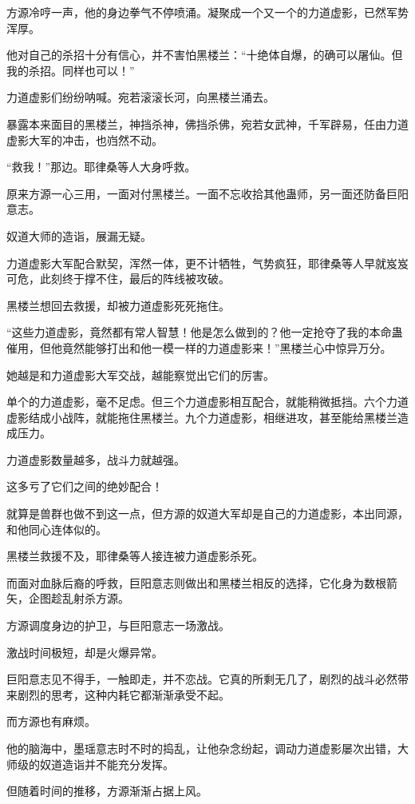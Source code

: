 \begin{this_body}
方源冷哼一声，他的身边拳气不停喷涌。凝聚成一个又一个的力道虚影，已然军势浑厚。

他对自己的杀招十分有信心，并不害怕黑楼兰：“十绝体自爆，的确可以屠仙。但我的杀招。同样也可以！”

力道虚影们纷纷呐喊。宛若滚滚长河，向黑楼兰涌去。

暴露本来面目的黑楼兰，神挡杀神，佛挡杀佛，宛若女武神，千军辟易，任由力道虚影大军的冲击，也岿然不动。

“救我！”那边。耶律桑等人大身呼救。

原来方源一心三用，一面对付黑楼兰。一面不忘收拾其他蛊师，另一面还防备巨阳意志。

奴道大师的造诣，展漏无疑。

力道虚影大军配合默契，浑然一体，更不计牺牲，气势疯狂，耶律桑等人早就岌岌可危，此刻终于撑不住，最后的阵线被攻破。

黑楼兰想回去救援，却被力道虚影死死拖住。

“这些力道虚影，竟然都有常人智慧！他是怎么做到的？他一定抢夺了我的本命蛊催用，但他竟然能够打出和他一模一样的力道虚影来！”黑楼兰心中惊异万分。

她越是和力道虚影大军交战，越能察觉出它们的厉害。

单个的力道虚影，毫不足虑。但三个力道虚影相互配合，就能稍微抵挡。六个力道虚影结成小战阵，就能拖住黑楼兰。九个力道虚影，相继进攻，甚至能给黑楼兰造成压力。

力道虚影数量越多，战斗力就越强。

这多亏了它们之间的绝妙配合！

就算是兽群也做不到这一点，但方源的奴道大军却是自己的力道虚影，本出同源，和他同心连体似的。

黑楼兰救援不及，耶律桑等人接连被力道虚影杀死。

而面对血脉后裔的呼救，巨阳意志则做出和黑楼兰相反的选择，它化身为数根箭矢，企图趁乱射杀方源。

方源调度身边的护卫，与巨阳意志一场激战。

激战时间极短，却是火爆异常。

巨阳意志见不得手，一触即走，并不恋战。它真的所剩无几了，剧烈的战斗必然带来剧烈的思考，这种内耗它都渐渐承受不起。

而方源也有麻烦。

他的脑海中，墨瑶意志时不时的捣乱，让他杂念纷起，调动力道虚影屡次出错，大师级的奴道造诣并不能充分发挥。

但随着时间的推移，方源渐渐占据上风。


\end{this_body}
